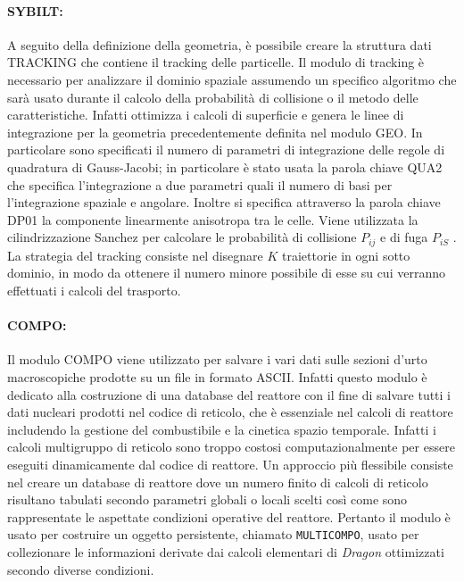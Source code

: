 \paragraph{SYBILT:}
A seguito della definizione della geometria, è possibile creare la struttura 
dati TRACKING che contiene il tracking delle particelle.
Il modulo di tracking è necessario per analizzare il dominio spaziale assumendo 
un specifico algoritmo che sarà usato durante il calcolo della probabilità di 
collisione o il metodo delle caratteristiche.
Infatti ottimizza i calcoli di superficie e genera le linee di integrazione 
per la geometria precedentemente definita nel modulo GEO.
In particolare sono specificati il numero di parametri di integrazione delle 
regole di quadratura di Gauss-Jacobi; in particolare è stato usata la parola 
chiave QUA2 che specifica l'integrazione a due parametri quali il numero di 
basi 
per l'integrazione spaziale e angolare.
Inoltre si specifica attraverso la parola chiave DP01 la componente linearmente 
anisotropa tra le celle.
Viene utilizzata la cilindrizzazione Sanchez per calcolare le probabilità di 
collisione $P_{ij}$ e di fuga $P_{iS}$ \cite{sanchez}.
La strategia del tracking consiste nel disegnare $K$ traiettorie in ogni sotto 
dominio, in modo da ottenere il numero minore possibile di esse su cui verranno
effettuati i calcoli del trasporto.


\paragraph{COMPO:}
Il modulo COMPO viene utilizzato per salvare i vari dati sulle sezioni d'urto 
macroscopiche prodotte su un file in formato ASCII. Infatti questo modulo è 
dedicato alla costruzione di una database del reattore con il fine di salvare 
tutti i dati nucleari prodotti nel codice di reticolo, che è essenziale nel 
calcoli di reattore includendo la gestione del combustibile e la cinetica 
spazio 
temporale.
Infatti i calcoli multigruppo di reticolo sono troppo costosi 
computazionalmente 
per essere eseguiti dinamicamente dal codice di reattore.
Un approccio più flessibile consiste nel creare un database di reattore dove un 
numero finito di calcoli di reticolo risultano tabulati secondo parametri 
globali o locali scelti così come sono rappresentate le aspettate condizioni 
operative del reattore.
Pertanto il modulo è usato per costruire un oggetto persistente, chiamato 
\texttt{MULTICOMPO}, usato per collezionare le informazioni derivate dai calcoli 
elementari di \textit{Dragon} ottimizzati secondo diverse condizioni.

